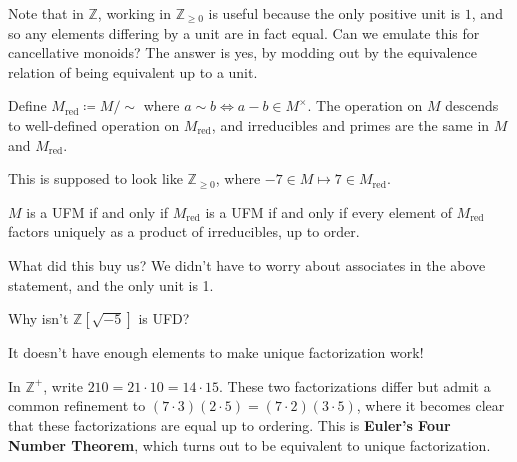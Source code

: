 Note that in \({\mathbb{Z}}\), working in \({\mathbb{Z}}_{\geq 0}\) is
useful because the only positive unit is \(1\), and so any elements
differing by a unit are in fact equal. Can we emulate this for
cancellative monoids? The answer is yes, by modding out by the
equivalence relation of being equivalent up to a unit.

\begin{definition}

Define \(M_{\operatorname{red}}\coloneqq M/\sim\) where
\(a\sim b \iff a-b\in M^{\times}\). The operation on \(M\) descends to
well-defined operation on \(M_{\operatorname{red}}\), and irreducibles
and primes are the same in \(M\) and \(M_{\operatorname{red}}\).

\end{definition}

\begin{example}[?]

This is supposed to look like \({\mathbb{Z}}_{\geq 0}\), where
\(-7\in M \mapsto 7 \in M_{\operatorname{red}}\).

\end{example}

\begin{proposition}[?]

\(M\) is a UFM if and only if \(M_{\operatorname{red}}\) is a UFM if and
only if every element of \(M_{\operatorname{red}}\) factors uniquely as
a product of irreducibles, up to order.

\end{proposition}

What did this buy us? We didn't have to worry about associates in the
above statement, and the only unit is 1.

\begin{question}

Why isn't \({\mathbb{Z}}[ \sqrt{-5} ]\) is UFD?

\end{question}

\begin{answer}

It doesn't have enough elements to make unique factorization work!

\end{answer}

\begin{example}[?]

In \({\mathbb{Z}}^+\), write \(210 = 21\cdot 10 = 14 \cdot 15\). These
two factorizations differ but admit a common refinement to
\((7\cdot 3)(2\cdot 5) = (7\cdot 2)(3\cdot 5)\), where it becomes clear
that these factorizations are equal up to ordering. This is
\textbf{Euler's Four Number Theorem}, which turns out to be equivalent
to unique factorization.

\end{example}

